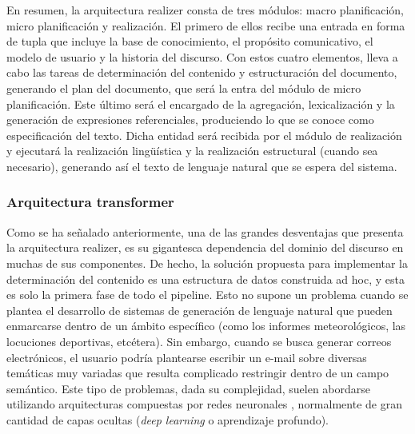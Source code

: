 En resumen, la arquitectura realizer consta de tres módulos: macro planificación, micro planificación y realización. El primero de ellos recibe una entrada en forma de tupla que incluye la base de conocimiento, el propósito comunicativo, el modelo de usuario y la historia del discurso. Con estos cuatro elementos, lleva a cabo las tareas de determinación del contenido y estructuración del documento, generando el plan del documento, que será la entra del módulo de micro planificación. Este último será el encargado de la agregación, lexicalización y la generación de expresiones referenciales, produciendo lo que se conoce como especificación del texto. Dicha entidad será recibida por el módulo de realización y ejecutará la realización lingüística y la realización estructural (cuando sea necesario), generando así el texto de lenguaje natural que se espera del sistema.

\subsubsection{Arquitectura transformer}\label{sss:transformer}
Como se ha señalado anteriormente, una de las grandes desventajas que presenta la arquitectura realizer, es su gigantesca dependencia del dominio del discurso en muchas de sus componentes. De hecho, la solución propuesta para implementar la determinación del contenido es una estructura de datos construida ad hoc, y esta es solo la primera fase de todo el pipeline. Esto no supone un problema cuando se plantea el desarrollo de sistemas de generación de lenguaje natural que pueden enmarcarse dentro de un ámbito específico (como los informes meteorológicos, las locuciones deportivas, etcétera). Sin embargo, cuando se busca generar correos electrónicos, el usuario podría plantearse escribir un e-mail sobre diversas temáticas muy variadas que resulta complicado restringir dentro de un campo semántico. Este tipo de problemas, dada su complejidad, suelen abordarse utilizando arquitecturas compuestas por redes neuronales \citep{goldberg2016primer}, normalmente de gran cantidad de capas ocultas (\textit{deep learning} o aprendizaje profundo).
